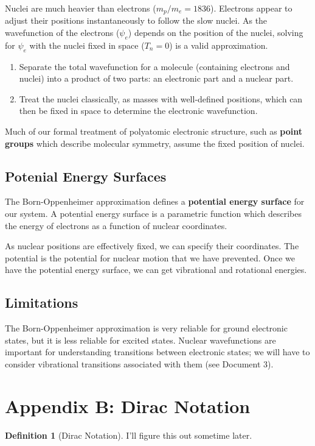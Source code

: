 \documentclass[a4paper]{tufte-handout}
\theoremstyle{definition}
\newtheorem{definition}{Definition}
\begin{document}
Nuclei are much heavier than electrons ($m_p / m_e = 1836$). Electrons appear to adjust their positions instantaneously to follow the slow nuclei.
As the wavefunction of the electrons ($\psi_e$) depends on the position of the nuclei, solving for $\psi_e$ with the nuclei fixed in space ($T_n = 0$) is a valid approximation.

\begin{enumerate}
  \item Separate the total wavefunction for a molecule (containing electrons and nuclei) into a product of two parts: an electronic part and a nuclear part.
  \item Treat the nuclei classically, as masses with well-defined positions, which can then be fixed in space to determine the electronic wavefunction.
\end{enumerate}

Much of our formal treatment of polyatomic electronic structure, such as \textbf{point groups}
which describe molecular symmetry, assume the fixed position of nuclei.

\subsection{Potenial Energy Surfaces}

The Born-Oppenheimer approximation defines a \textbf{potential energy surface} for our system.
A potential energy surface is a parametric function which describes the energy of electrons
as a function of nuclear coordinates. 

As nuclear positions are effectively fixed, we can specify their coordinates. The potential is the potential for nuclear motion that we have prevented.
Once we have the potential energy surface, 
we can get vibrational and rotational energies. 

\subsection{Limitations}

The Born-Oppenheimer approximation is very reliable for ground electronic 
states, but it is less reliable for excited states. Nuclear wavefunctions
are important for understanding transitions between electronic states; we will have to consider vibrational transitions associated with them (see Document 3).

\section{Appendix B: Dirac Notation}

\begin{definition}[Dirac Notation]
  I'll figure this out sometime later.
  
\end{definition}



\end{document}
